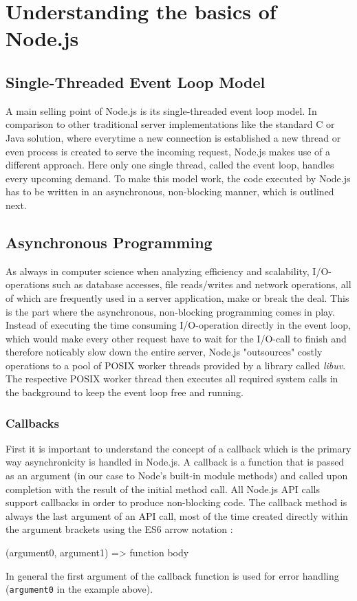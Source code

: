 \documentclass{bioinfo}
\begin{document}
\section{Understanding the basics of Node.js}
\subsection{Single-Threaded Event Loop Model}

A main selling point of Node.js is its single-threaded event loop model. In comparison to other traditional server implementations like the standard C or Java solution, where everytime a new connection is established a new thread or even process is created to serve the incoming request, Node.js makes use of a different approach. Here only one single thread, called the event loop, handles every upcoming demand. To make this model work, the code executed by Node.js has to be written in an asynchronous, non-blocking manner, which is outlined next. \cite{nodejseventloop}

\subsection{Asynchronous Programming}
As always in computer science when analyzing efficiency and scalability, I/O-operations such as database accesses, file reads/writes and network operations, all of which are frequently used in a server application, make or break the deal. This is the part where the asynchronous, non-blocking programming comes in play. Instead of executing the time consuming I/O-operation directly in the event loop, which would make every other request have to wait for the I/O-call to finish and therefore noticably slow down the entire server, Node.js "outsources" costly operations to a pool of POSIX worker threads provided by a library called \textit{libuv}. The respective POSIX worker thread then executes all required system calls in the background to keep the event loop free and running. \cite{nodejseventloop}

\subsubsection{Callbacks}
First it is important to understand the concept of a callback which is the primary way asynchronicity is handled in Node.js. A callback is a function that is passed as an argument (in our case to Node's built-in module methods) and called upon completion with the result of the initial method call. All Node.js API calls support callbacks in order to produce non-blocking code. The callback method is always the last argument of an API call, most of the time created directly within the argument brackets using the ES6 arrow notation \cite{nodejsarrow}: 
\begin{verbatim*}
    (argument0, argument1) => { function body }
\end{verbatim*}
In general the first argument of the callback function is used for error handling (\texttt{argument0} in the example above).
\end{document}
